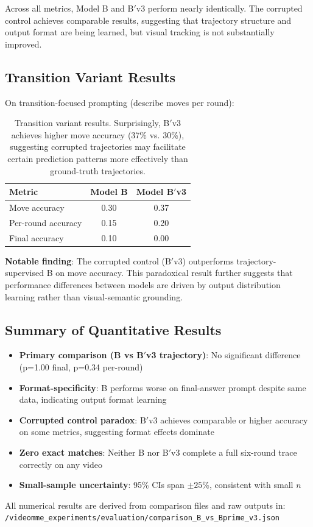 Across all metrics, Model B and B$'$v3 perform nearly identically. The corrupted control achieves comparable results, suggesting that trajectory structure and output format are being learned, but visual tracking is not substantially improved.

\subsection{Transition Variant Results}

On transition-focused prompting (describe moves per round):

\begin{table}[h]
\centering
\begin{tabular}{lcc}
\toprule
\textbf{Metric} & \textbf{Model B} & \textbf{Model B$'$v3} \\
\midrule
Move accuracy & 0.30 & 0.37 \\
Per-round accuracy & 0.15 & 0.20 \\
Final accuracy & 0.10 & 0.00 \\
\bottomrule
\end{tabular}
\caption{\label{tab:transition} Transition variant results. Surprisingly, B$'$v3 achieves higher move accuracy (37\% vs. 30\%), suggesting corrupted trajectories may facilitate certain prediction patterns more effectively than ground-truth trajectories.}
\end{table}

\textbf{Notable finding}: The corrupted control (B$'$v3) outperforms trajectory-supervised B on move accuracy. This paradoxical result further suggests that performance differences between models are driven by output distribution learning rather than visual-semantic grounding.

\subsection{Summary of Quantitative Results}

\begin{itemize}
    \item \textbf{Primary comparison (B vs B$'$v3 trajectory)}: No significant difference (p=1.00 final, p=0.34 per-round)
    \item \textbf{Format-specificity}: B performs worse on final-answer prompt despite same data, indicating output format learning
    \item \textbf{Corrupted control paradox}: B$'$v3 achieves comparable or higher accuracy on some metrics, suggesting format effects dominate
    \item \textbf{Zero exact matches}: Neither B nor B$'$v3 complete a full six-round trace correctly on any video
    \item \textbf{Small-sample uncertainty}: 95\% CIs span $\pm 25$\%, consistent with small $n$
\end{itemize}

All numerical results are derived from comparison files and raw outputs in: \\
\texttt{/videomme\_experiments/evaluation/comparison\_B\_vs\_Bprime\_v3.json}

